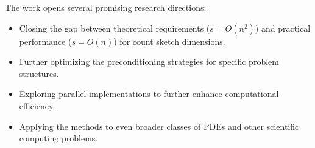 \documentclass[11pt]{article}
\begin{document}
The work opens several promising research directions:

\begin{itemize}
    \item Closing the gap between theoretical requirements ($s = O(n^2)$) and practical performance ($s = O(n)$) for count sketch dimensions.
    
    \item Further optimizing the preconditioning strategies for specific problem structures.
    
    \item Exploring parallel implementations to further enhance computational efficiency.
    
    \item Applying the methods to even broader classes of PDEs and other scientific computing problems.
\end{itemize}
\end{document}
